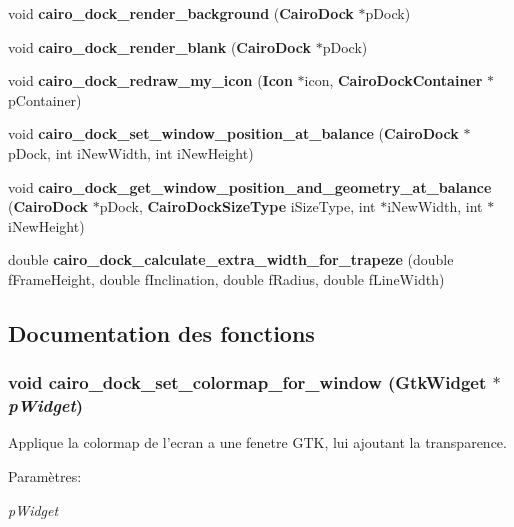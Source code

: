 \begin{CompactItemize}
\item 
void {\bf cairo\_\-dock\_\-render\_\-background} ({\bf CairoDock} $\ast$pDock)
\item 
void {\bf cairo\_\-dock\_\-render\_\-blank} ({\bf CairoDock} $\ast$pDock)
\item 
void {\bf cairo\_\-dock\_\-redraw\_\-my\_\-icon} ({\bf Icon} $\ast$icon, {\bf CairoDockContainer} $\ast$pContainer)
\item 
void {\bf cairo\_\-dock\_\-set\_\-window\_\-position\_\-at\_\-balance} ({\bf CairoDock} $\ast$pDock, int iNewWidth, int iNewHeight)
\item 
void {\bf cairo\_\-dock\_\-get\_\-window\_\-position\_\-and\_\-geometry\_\-at\_\-balance} ({\bf CairoDock} $\ast$pDock, {\bf CairoDockSizeType} iSizeType, int $\ast$iNewWidth, int $\ast$iNewHeight)
\item 
double {\bf cairo\_\-dock\_\-calculate\_\-extra\_\-width\_\-for\_\-trapeze} (double fFrameHeight, double fInclination, double fRadius, double fLineWidth)
\end{CompactItemize}


\subsection{Documentation des fonctions}
\subsubsection{\setlength{\rightskip}{0pt plus 5cm}void cairo\_\-dock\_\-set\_\-colormap\_\-for\_\-window (GtkWidget $\ast$ {\em pWidget})}\label{cairo-dock-draw_8h_3c7e37f5ffc3482f9487f4dbc9491b93}


Applique la colormap de l'ecran a une fenetre GTK, lui ajoutant la transparence. \begin{Desc}
\item[Paramètres:]
\begin{description}
\item[{\em pWidget}]\end{description}
\end{Desc}
